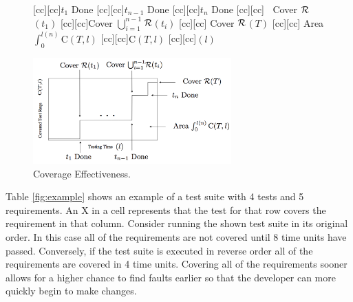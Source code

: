 \documentclass{vgtc}                          %
\begin{document}
\begin{table}[t]
\centering
{}
\caption{Example Test Suite}
\end{table}
\label{fig:example}

\begin{figure}[t]
\centering
{}[cc][cc]{$t_1$ Done}
[cc][cc]{$t_{n-1}$ Done}
[cc][cc]{$t_{n}$ Done}
[cc][cc]{$\;\;$ Cover $\cal{R}$$(t_1)$}
[cc][cc]{Cover $\bigcup_{i = 1}^{n-1}$$ \cal{R}$$(t_i)$}
[cc][cc]{\hspace{10pt} Cover $\cal{R}$$(T)$}
[cc][cc]{\hspace{10pt} Area $\int_0^{l(n)} \mathrm{C}(T, l)$}
[cc][cc]{${\scriptstyle \mathrm{C}(T,l)}$}
[cc][cc]{$(l)$}

\includegraphics[width=3in]{cum_cov_final.png}
\vspace{.05in}
\caption{Coverage Effectiveness.} %
\vspace{-.2in}
\label{fig:ce}
\end{figure}	


Table \ref{fig:example} shows an example of a test suite with 4 tests and 5 requirements.  An X in a cell represents that the test for that row covers the requirement in that column.  Consider running the shown test suite in its original order.  In this case all of the requirements are not covered until 8 time units have passed.  Conversely, if the test suite is executed in reverse order all of the requirements are covered in 4 time units.  Covering all of the requirements sooner allows for a higher chance to find faults earlier so that the developer can more quickly begin to make changes.
\end{document}
